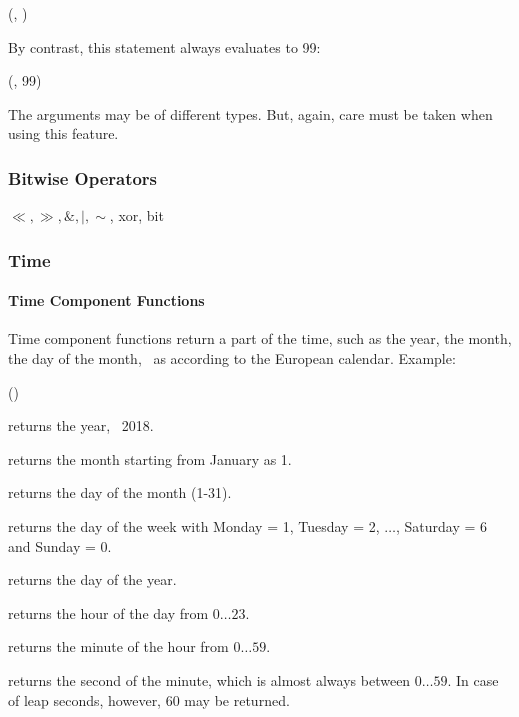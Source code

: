 (, )

By contrast, this statement always evaluates to 99:

(, 99)

The arguments may be of different types.
But, again, care must be taken when using this feature.

\subsubsection{Bitwise Operators}
$\ll, \gg, \&, |,\sim$, xor, bit


\subsubsection{Time}
\paragraph{Time Component Functions}
Time component functions return a part of the time,
such as the year, the month, the day of the month,
\etc\ as  according to the European calendar.
Example:

 ()
 

 returns the year, \eg\ 2018.

returns the month starting from January as 1.

returns the day of the month (1-31).

returns the day of the week with
Monday = 1, Tuesday = 2, $\dots$, Saturday = 6 and
Sunday = 0.

returns the day of the year.

returns the hour of the day from $0\dots 23$.

returns the minute of the hour from $0\dots 59$.

returns the second of the minute,
which is almost always between $0\dots 59$.
In case of leap seconds, however, 60 may be returned.

